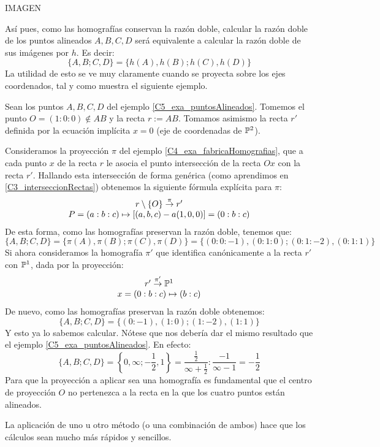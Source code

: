 IMAGEN

Así pues, como las homografías conservan la razón doble, calcular la razón doble de los puntos alineados $A,B,C,D$ será equivalente a calcular la razón doble de sus imágenes por $h$. Es decir:
\[\{A,B;C,D\}=\{h(A),h(B);h(C),h(D)\}\]
La utilidad de esto se ve muy claramente cuando se proyecta sobre los ejes coordenados, tal y como muestra el siguiente ejemplo.
\begin{exa}\label{C5:ej_proy_sobre_ejes}
	Sean los puntos $A,B,C,D$ del ejemplo \ref{C5_exa_puntosAlineados}. Tomemos el punto $O=(1:0:0)\not\in AB$ y la recta $r:=AB$. Tomamos asimismo la recta $r'$ definida por la ecuación implícita $x=0$ (eje de coordenadas de $\mathbb{P}^2$).
	
	Consideramos la proyección $\pi$ del ejemplo \ref{C4_exa_fabricaHomografias}, que a cada punto $x$ de la recta $r$ le asocia el punto intersección de la recta $Ox$ con la recta $r'$. Hallando esta intersección de forma genérica (como aprendimos en \ref{C3_interseccionRectas}) obtenemos la siguiente fórmula explícita para $\pi$:
	\[\begin{array}{c}
	r\setminus\{O\}\stackrel{\pi}{\to} r'\\
	P=(a:b:c)\mapsto\left [ (a,b,c)-a(1,0,0) \right ]=(0:b:c)
	\end{array}\]
	De esta forma, como las homografías preservan la razón doble, tenemos que:
	\[\{A,B;C,D\}=\{\pi(A),\pi(B);\pi(C),\pi(D)\}=\{(0:0:-1),(0:1:0);(0:1:-2),(0:1:1)\}\]
	Si ahora consideramos la homografía $\pi'$ que identifica canónicamente a la recta $r'$ con $\mathbb{P}^1$, dada por la proyección:
	\[\begin{array}{c}
	r'\stackrel{\pi'}{\to}\mathbb{P}^1\\
	x=(0:b:c)\mapsto(b:c)
	\end{array}\]
	De nuevo, como las homografías preservan la razón doble obtenemos:
	\[\{A,B;C,D\}=\{(0:-1),(1:0);(1:-2),(1:1)\}\]
	Y esto ya lo sabemos calcular. Nótese que nos debería dar el mismo resultado que el ejemplo \ref{C5_exa_puntosAlineados}. En efecto:
	\[\{A,B;C,D\}=\left\{0,\infty;-\frac{1}{2},1\right\}=\frac{\frac{1}{2}}{\infty+\frac{1}{2}}:\frac{-1}{\infty-1}=-\frac{1}{2}\]
	Para que la proyección a aplicar sea una homografía es fundamental que el centro de proyección $O$ no pertenezca a la recta en la que los cuatro puntos están alineados.
\end{exa}

La aplicación de uno u otro método (o una combinación de ambos) hace que los cálculos sean mucho más rápidos y sencillos.
